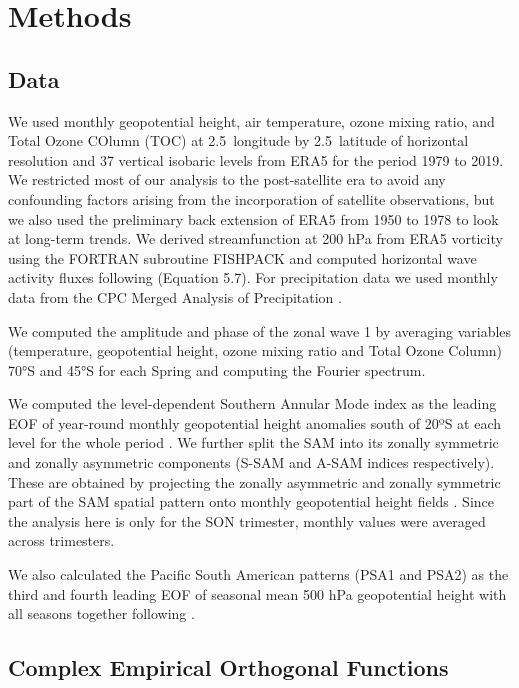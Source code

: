 \documentclass[smallextended]{svjour3}       %
\begin{document}
\hypertarget{methods}{%
\section{Methods}\label{methods}}

\hypertarget{data}{%
\subsection{Data}\label{data}}

We used monthly geopotential height, air temperature, ozone mixing ratio, and Total Ozone COlumn (TOC) at 2.5\degree~longitude by 2.5\degree~latitude of horizontal resolution and 37 vertical isobaric levels from ERA5 \citep{era5} for the period 1979 to 2019. We restricted most of our analysis to the post-satellite era to avoid any confounding factors arising from the incorporation of satellite observations, but we also used the preliminary back extension of ERA5 from 1950 to 1978 \citep{era5be} to look at long-term trends. We derived streamfunction at 200 hPa from ERA5 vorticity using the FORTRAN subroutine FISHPACK \citep{fishpack} and computed horizontal wave activity fluxes following \citet{plumb1985} (Equation 5.7). For precipitation data we used monthly data from the CPC Merged Analysis of Precipitation \citep{cmap}.

We computed the amplitude and phase of the zonal wave 1 by averaging variables (temperature, geopotential height, ozone mixing ratio and Total Ozone Column) 70°S and 45°S for each Spring and computing the Fourier spectrum.

We computed the level-dependent Southern Annular Mode index as the leading EOF of year-round monthly geopotential height anomalies south of 20ºS at each level for the whole period \citep{baldwin2009}. We further split the SAM into its zonally symmetric and zonally asymmetric components (S-SAM and A-SAM indices respectively). These are obtained by projecting the zonally asymmetric and zonally symmetric part of the SAM spatial pattern onto monthly geopotential height fields \citep{campitelli2021}. Since the analysis here is only for the SON trimester, monthly values were averaged across trimesters.

We also calculated the Pacific South American patterns (PSA1 and PSA2) as the third and fourth leading EOF of seasonal mean 500 hPa geopotential height with all seasons together following \citet{mo2001}.

\hypertarget{complex-empirical-orthogonal-functions}{%
\subsection{Complex Empirical Orthogonal Functions}\label{complex-empirical-orthogonal-functions}}
\end{document}
